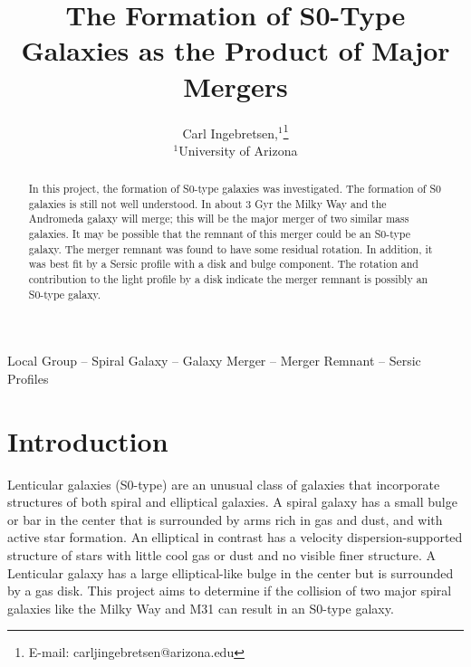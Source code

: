 \documentclass[fleqn,usenatbib]{mnras}
\title[S0-Type Galaxy Formation]{The Formation of S0-Type Galaxies as the Product of Major Mergers}
\author[Carl Ingebretsen]{
Carl Ingebretsen,$^{1}$\thanks{E-mail: carljingebretsen@arizona.edu}
\\
$^{1}$University of Arizona\\
}
\begin{document}
\label{firstpage}
\pagerange{\pageref{firstpage}--\pageref{lastpage}}
\maketitle

\begin{abstract}
In this project, the formation of S0-type galaxies was investigated. The formation of S0 galaxies is still not well understood. In about 3 Gyr the Milky Way and the Andromeda galaxy will merge; this will be the major merger of two similar mass galaxies. It may be possible that the remnant of this merger could be an S0-type galaxy. The merger remnant was found to have some residual rotation. In addition, it was best fit by a Sersic profile with a disk and bulge component. The rotation and contribution to the light profile by a disk indicate the merger remnant is possibly an S0-type galaxy.
\end{abstract}

\begin{keywords}
Local Group -- Spiral Galaxy -- Galaxy Merger -- Merger Remnant -- Sersic Profiles
\end{keywords}



\section{Introduction}
Lenticular galaxies (S0-type) are an unusual class of galaxies that incorporate structures of both spiral and elliptical galaxies. A spiral galaxy has a small bulge or bar in the center that is surrounded by arms rich in gas and dust, and with active star formation. An elliptical in contrast has a velocity dispersion-supported structure of stars with little cool gas or dust and no visible finer structure. A Lenticular galaxy has a large elliptical-like bulge in the center but is surrounded by a gas disk. This project aims to determine if the collision of two major spiral galaxies like the Milky Way and M31 can result in an S0-type galaxy.

\end{document}
